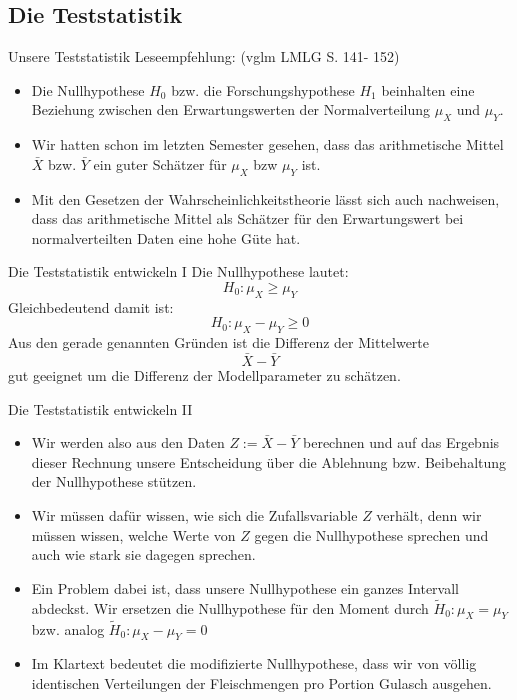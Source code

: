 \documentclass[usenames,dvipsnames,handout]{beamer}
\begin{document}
\subsection{Die Teststatistik}
\begin{frame}{Unsere  Teststatistik}
Leseempfehlung:  (vglm LMLG S. 141- 152)
\begin{itemize}
\item{Die Nullhypothese $H_{0}$ bzw. die Forschungshypothese $H_{1}$ beinhalten eine Beziehung
zwischen den Erwartungswerten der Normalverteilung $\mu_{X}$ und $\mu_{Y}.$}\pause
\item{Wir hatten schon im letzten Semester gesehen, dass das arithmetische Mittel $\bar{X}$ bzw. $\bar{Y}$
ein guter Schätzer für $\mu_{X}$ bzw $\mu_{Y}$ ist.}\pause
\item{Mit den Gesetzen der Wahrscheinlichkeitstheorie lässt sich auch nachweisen, dass das arithmetische Mittel
als Schätzer für den Erwartungswert bei normalverteilten Daten eine hohe Güte hat.}\pause
\end{itemize}
\end{frame}

\begin{frame}{Die Teststatistik entwickeln I}
Die Nullhypothese lautet: $$H_{0}:  \mu_{X} \geq \mu_{Y}$$ Gleichbedeutend damit ist: $$H_{0}:  \mu_{X} - \mu_{Y} \geq 0$$
Aus den gerade genannten Gründen ist die Differenz der Mittelwerte 
$$\bar{X}-\bar{Y}$$ gut geeignet um die Differenz der Modellparameter zu schätzen.
\end{frame}

\begin{frame}{Die Teststatistik entwickeln II}
\begin{itemize}
\item{Wir werden also aus den Daten $Z:=\bar{X}-\bar{Y}$ berechnen und auf das Ergebnis dieser Rechnung unsere Entscheidung über die Ablehnung
bzw. Beibehaltung der Nullhypothese stützen.}\pause
\item{Wir müssen dafür wissen, wie sich die Zufallsvariable $Z$ verhält, denn wir müssen wissen, welche Werte von $Z$ gegen die Nullhypothese
sprechen und auch wie stark sie dagegen sprechen.}\pause
\item{Ein Problem dabei ist, dass unsere Nullhypothese ein ganzes Intervall abdeckst. Wir ersetzen die Nullhypothese
für den Moment durch $\tilde{H}_{0}: \mu_{X} = \mu_{Y}$ bzw. analog $\tilde{H}_{0}:  \mu_{X} - \mu_{Y} = 0$}\pause
\item{Im Klartext bedeutet die modifizierte Nullhypothese, dass wir von völlig identischen Verteilungen der Fleischmengen pro Portion Gulasch ausgehen.}
\end{itemize}
\end{frame}
\end{document}
